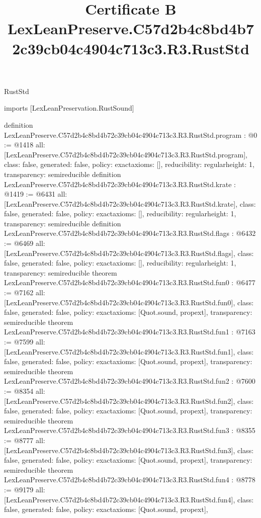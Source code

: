 \begin{lexlean}{RustStd}
\title{Certificate B LexLeanPreserve.C57d2b4c8bd4b72c39cb04c4904c713c3.R3.RustStd}
\begin{coremodule}
imports [LexLeanPreservation.RustSound]

definition LexLeanPreserve.C57d2b4c8bd4b72c39cb04c4904c713c3.R3.RustStd.program : @0 := @1418 {
  all: [LexLeanPreserve.C57d2b4c8bd4b72c39cb04c4904c713c3.R3.RustStd.program],
  class: false,
  generated: false,
  policy: exact{axioms: []},
  reducibility: regular{height: 1},
  transparency: semireducible
}
definition LexLeanPreserve.C57d2b4c8bd4b72c39cb04c4904c713c3.R3.RustStd.krate : @1419 := @6431 {
  all: [LexLeanPreserve.C57d2b4c8bd4b72c39cb04c4904c713c3.R3.RustStd.krate],
  class: false,
  generated: false,
  policy: exact{axioms: []},
  reducibility: regular{height: 1},
  transparency: semireducible
}
definition LexLeanPreserve.C57d2b4c8bd4b72c39cb04c4904c713c3.R3.RustStd.flags : @6432 := @6469 {
  all: [LexLeanPreserve.C57d2b4c8bd4b72c39cb04c4904c713c3.R3.RustStd.flags],
  class: false,
  generated: false,
  policy: exact{axioms: []},
  reducibility: regular{height: 1},
  transparency: semireducible
}
theorem LexLeanPreserve.C57d2b4c8bd4b72c39cb04c4904c713c3.R3.RustStd.fun0 : @6477 := @7162 {
  all: [LexLeanPreserve.C57d2b4c8bd4b72c39cb04c4904c713c3.R3.RustStd.fun0],
  class: false,
  generated: false,
  policy: exact{axioms: [Quot.sound, propext]},
  transparency: semireducible
}
theorem LexLeanPreserve.C57d2b4c8bd4b72c39cb04c4904c713c3.R3.RustStd.fun1 : @7163 := @7599 {
  all: [LexLeanPreserve.C57d2b4c8bd4b72c39cb04c4904c713c3.R3.RustStd.fun1],
  class: false,
  generated: false,
  policy: exact{axioms: [Quot.sound, propext]},
  transparency: semireducible
}
theorem LexLeanPreserve.C57d2b4c8bd4b72c39cb04c4904c713c3.R3.RustStd.fun2 : @7600 := @8354 {
  all: [LexLeanPreserve.C57d2b4c8bd4b72c39cb04c4904c713c3.R3.RustStd.fun2],
  class: false,
  generated: false,
  policy: exact{axioms: [Quot.sound, propext]},
  transparency: semireducible
}
theorem LexLeanPreserve.C57d2b4c8bd4b72c39cb04c4904c713c3.R3.RustStd.fun3 : @8355 := @8777 {
  all: [LexLeanPreserve.C57d2b4c8bd4b72c39cb04c4904c713c3.R3.RustStd.fun3],
  class: false,
  generated: false,
  policy: exact{axioms: [Quot.sound, propext]},
  transparency: semireducible
}
theorem LexLeanPreserve.C57d2b4c8bd4b72c39cb04c4904c713c3.R3.RustStd.fun4 : @8778 := @9179 {
  all: [LexLeanPreserve.C57d2b4c8bd4b72c39cb04c4904c713c3.R3.RustStd.fun4],
  class: false,
  generated: false,
  policy: exact{axioms: [Quot.sound, propext]},
}
\end{coremodule}
\end{lexlean}
